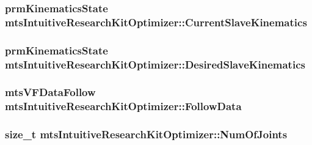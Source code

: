 \subsubsection[{Current\+Slave\+Kinematics}]{\setlength{\rightskip}{0pt plus 5cm}prm\+Kinematics\+State mts\+Intuitive\+Research\+Kit\+Optimizer\+::\+Current\+Slave\+Kinematics\hspace{0.3cm}{\ttfamily [protected]}}\label{classmts_intuitive_research_kit_optimizer_a10517be9e248c92c46501f6eea30433c}
\hypertarget{classmts_intuitive_research_kit_optimizer_a095ebf16dfbac51a8d8c24830824b856}{}
\subsubsection[{Desired\+Slave\+Kinematics}]{\setlength{\rightskip}{0pt plus 5cm}prm\+Kinematics\+State mts\+Intuitive\+Research\+Kit\+Optimizer\+::\+Desired\+Slave\+Kinematics\hspace{0.3cm}{\ttfamily [protected]}}\label{classmts_intuitive_research_kit_optimizer_a095ebf16dfbac51a8d8c24830824b856}
\hypertarget{classmts_intuitive_research_kit_optimizer_a08aabafa6727fbfa54b229e0faa21bdf}{}
\subsubsection[{Follow\+Data}]{\setlength{\rightskip}{0pt plus 5cm}mts\+V\+F\+Data\+Follow mts\+Intuitive\+Research\+Kit\+Optimizer\+::\+Follow\+Data\hspace{0.3cm}{\ttfamily [protected]}}\label{classmts_intuitive_research_kit_optimizer_a08aabafa6727fbfa54b229e0faa21bdf}
\hypertarget{classmts_intuitive_research_kit_optimizer_aa64f574f639972c9ef2ce46db04c48f6}{}
\subsubsection[{Num\+Of\+Joints}]{\setlength{\rightskip}{0pt plus 5cm}size\+\_\+t mts\+Intuitive\+Research\+Kit\+Optimizer\+::\+Num\+Of\+Joints\hspace{0.3cm}{\ttfamily [protected]}}\label{classmts_intuitive_research_kit_optimizer_aa64f574f639972c9ef2ce46db04c48f6}


